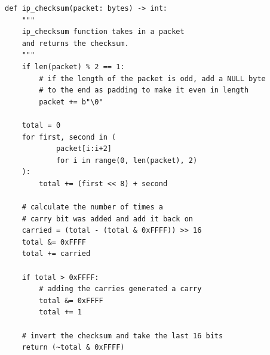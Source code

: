 \documentclass[titlepage]{article}
\begin{document}
\begin{algorithm}
\begin{algorithmic}[1]
\EndIf{}
\EndFor{}
\EndIf{}
\EndFunction{}
\end{algorithmic}
\end{algorithm}

\begin{lstlisting}[label=checksum,caption=\textit{A function for calculating the IP checksum for a set of bytes.}]
def ip_checksum(packet: bytes) -> int:
    """
    ip_checksum function takes in a packet
    and returns the checksum.
    """
    if len(packet) % 2 == 1:
        # if the length of the packet is odd, add a NULL byte
        # to the end as padding to make it even in length
        packet += b"\0"

    total = 0
    for first, second in (
            packet[i:i+2]
            for i in range(0, len(packet), 2)
    ):
        total += (first << 8) + second

    # calculate the number of times a
    # carry bit was added and add it back on
    carried = (total - (total & 0xFFFF)) >> 16
    total &= 0xFFFF
    total += carried

    if total > 0xFFFF:
        # adding the carries generated a carry
        total &= 0xFFFF
        total += 1

    # invert the checksum and take the last 16 bits
    return (~total & 0xFFFF)
\end{lstlisting}
\end{document}
